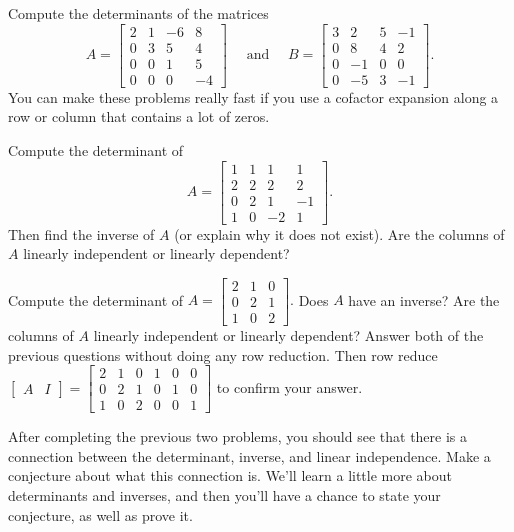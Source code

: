 \begin{problem}
 Compute the determinants of the matrices 
$$
A=
\begin{bmatrix}
 2 & 1 & -6 & 8 \\
 0 & 3 & 5 & 4 \\
 0 & 0 & 1 & 5 \\
 0 & 0 & 0 & -4
\end{bmatrix}
\quad\text{ and }\quad
B=
\begin{bmatrix}
 3 & 2 & 5 & -1 \\
 0 & 8 & 4 & 2 \\
 0 & -1 & 0 & 0 \\
 0 & -5 & 3 & -1
\end{bmatrix}
.$$
You can make these problems really fast if you use a cofactor expansion along a row or column that contains a lot of zeros.
\end{problem}


\begin{problem}
Compute the determinant of
 $$
A=\begin{bmatrix}
 1 & 1 & 1 & 1 \\
 2 & 2 & 2 & 2 \\
 0 & 2 & 1 & -1 \\
 1 & 0 & -2 & 1
\end{bmatrix}.
$$
Then find the inverse of $A$ (or explain why it does not exist).  Are the columns of $A$ linearly independent or linearly dependent?
\end{problem}


\begin{problem}
 Compute the determinant of $A=
\begin{bmatrix}
 2 & 1 & 0 \\
 0 & 2 & 1 \\
 1 & 0 & 2
\end{bmatrix}
.$  Does $A$ have an inverse?  Are the columns of $A$ linearly independent or linearly dependent?  Answer both of the previous questions without doing any row reduction.  Then row  reduce 
$\begin{bmatrix}A&I\end{bmatrix} = 
\begin{bmatrix}
 2 & 1 & 0 &1&0&0\\
 0 & 2 & 1 &0&1&0 \\
 1 & 0 & 2 &0&0&1
\end{bmatrix}
$ 
to confirm your answer.
\end{problem}

After completing the previous two problems, you should see that there is a connection between the determinant, inverse, and linear independence.  Make a conjecture about what this connection is.  We'll learn a little more about determinants and inverses, and then you'll have a chance to state your conjecture, as well as prove it.

